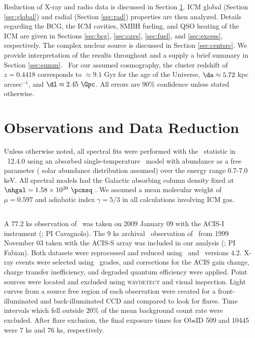 \documentclass[useAMS,usenatbib]{mn2e}
\begin{document}
Reduction of X-ray and radio data is discussed in Section
\ref{sec:obs}. ICM global (Section \ref{sec:global}) and radial
(Section \ref{sec:rad}) properties are then analyzed. Details
regarding the BCG, the ICM cavities, SMBH fueling, and QSO heating of
the ICM are given in Sections \ref{sec:bcg}, \ref{sec:cavs},
\ref{sec:fuel}, and \ref{sec:excess}, respectively. The complex
nuclear source is discussed in Section \ref{sec:centsrc}. We provide
interpretation of the results throughout and a supply a brief summary
in Section \ref{sec:summ}. \LCDM\ For our assumed cosmography, the
cluster redshift of $z = 0.4418$ corresponds to $\approx 9.1$ Gyr for
the age of the Universe, $\da \approx 5.72$ kpc arcsec$^{-1}$, and
$\dl \approx 2.45~\Gpc$. All errors are 90\% confidence unless stated
otherwise.

\section{Observations and Data Reduction}
\label{sec:obs}

Unless otherwise noted, all spectral fits were performed with the
\chisq\ statistic in \xspec\ 12.4.0 \citep{xspec} using an absorbed
single-temperature \mekal\ model \citep{mekal1, mekal2} with abundance
as a free parameter (\citealt{ag89} solar abundance distribution
assumed) over the energy range 0.7-7.0 keV. All spectral models had
the Galactic absorbing column density fixed at $\nhgal = 1.58 \times
10^{20} ~\pcmsq$ \citep{lab}. We assumed a mean molecular weight of
$\mu = 0.597$ and adiabatic index $\gamma = 5/3$ in all calculations
involving ICM gas.

\subsection{\chandra}
\label{sec:xray}

A 77.2 ks observation of \irs\ was taken on 2009 January 09 with the
ACIS-I instrument (; PI
Cavagnolo). The 9 ks archival \chandra\ observation of \irs\ from 1999
November 03 taken with the ACIS-S array was included in our analysis
(; PI Fabian). Both
datasets were reprocessed and reduced using \ciao\ and
\caldb\ versions 4.2. X-ray events were selected using \asca\ grades,
and corrections for the ACIS gain change, charge transfer
inefficiency, and degraded quantum efficiency were applied. Point
sources were located and excluded using {\textsc{wavdetect}} and
visual inspection. Light curves from a source free region of each
observation were created for a front-illuminated and back-illuminated
CCD and compared to look for flares. Time intervals which fell outside
$20\%$ of the mean background count rate were excluded. After flare
exclusion, the final exposure times for ObsID 509 and 10445 were 7 ks
and 76 ks, respectively.
\end{document}
